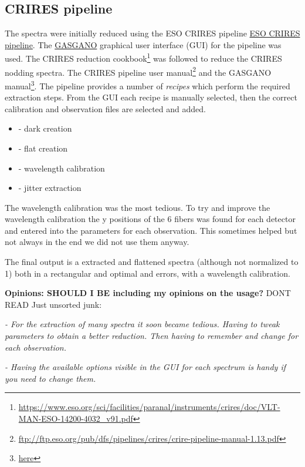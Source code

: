 \subsection{CRIRES pipeline}
The spectra were initially reduced using the ESO CRIRES pipeline \href{ESO CRIRES pipeline}{ESO CRIRES pipeline}. The \href{https://www.eso.org/sci/software/gasgano.html}{GASGANO} graphical user interface (GUI) for the pipeline was used. The CRIRES reduction cookbook\footnote{\href{https://www.eso.org/sci/facilities/paranal/instruments/crires/doc/VLT-MAN-ESO-14200-4032\_v91.pdf}{https://www.eso.org/sci/facilities/paranal/instruments/crires/doc/VLT-MAN-ESO-14200-4032\_v91.pdf}} was followed to reduce the CRIRES nodding spectra. The CRIRES pipeline user manual\footnote{\href{ftp://ftp.eso.org/pub/dfs/pipelines/crires/crire-pipeline-manual-1.13.pdf}{ftp://ftp.eso.org/pub/dfs/pipelines/crires/crire-pipeline-manual-1.13.pdf}} and the GASGANO manual\footnote{\href{here}{here}}. The pipeline provides a number of \emph{recipes} which perform the required extraction steps. From the GUI each recipe is manually selected, then the correct calibration and observation files are selected and added. 
\begin{itemize}
\item - dark creation
\item - flat creation
\item - wavelength calibration
\item - jitter extraction
\end{itemize}

The wavelength calibration was the most tedious. To try and improve the wavelength calibration the y positions of the 6 {\thar} fibers was found for each detector and entered into the parameters for each observation. This sometimes helped but not always in the end we did not use them anyway.

The final output is a extracted and flattened spectra (although not normalized to 1) both in a rectangular and optimal and errors, with a wavelength calibration.

\textbf{Opinions: SHOULD I BE including my opinions on the usage?}
DONT READ Just unsorted junk: 

\textit{- For the extraction of many spectra it soon became tedious. Having to tweak parameters to obtain a better reduction. Then having to remember and change for each observation. }

\textit{- Having the available options visible in the GUI for each spectrum is handy if you need to change them.}



